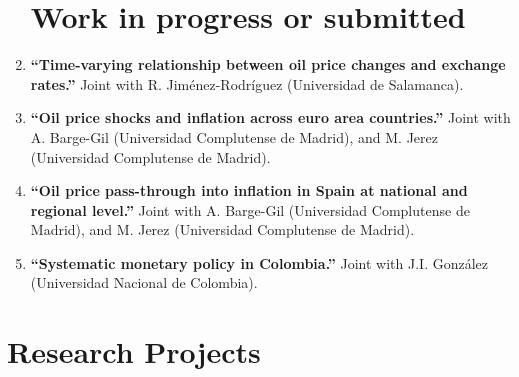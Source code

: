 \documentclass[11pt]{article}\usepackage[]{graphicx}\usepackage[]{color}
\begin{document}
\begin{enumerate}
\noindent
\section{Work in progress or submitted}

\item \textbf{``Time-varying relationship between oil price changes and exchange rates.''} Joint with R. Jiménez-Rodríguez (Universidad de Salamanca).

\item \textbf{``Oil price shocks and inflation across euro area countries.''} Joint with A. Barge-Gil (Universidad Complutense de Madrid), and M. Jerez (Universidad Complutense de Madrid).

\item \textbf{``Oil price pass-through into inflation in Spain at national and regional level.''} Joint with A. Barge-Gil (Universidad Complutense de Madrid), and M. Jerez (Universidad Complutense de Madrid).

\item \textbf{``Systematic monetary policy in Colombia.''} Joint with J.I. González (Universidad Nacional de Colombia).
\\
\end{enumerate}


\section{Research Projects} 
\end{document}
